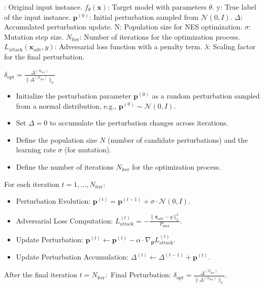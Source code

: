 : Original input instance.  
$f_{\theta}(\mathbf{x})$: Target model with parameters $\theta$.  
y: True label of the input instance.  
$\mathbf{p}^{(0)}$: Initial perturbation sampled from $\mathcal{N}(0, I)$.  
$\Delta$: Accumulated perturbation update.  
N: Population size for NES optimization.  
$\sigma$: Mutation step size.  
$N_{\text{iter}}$: Number of iterations for the optimization process.  
$L_{\text{attack}}(\mathbf{x}_{\text{adv}}, y)$: Adversarial loss function with a penalty term.  
$\lambda$: Scaling factor for the final perturbation.

$\delta_{\text{opt}} = \frac{\Delta^{(N_{\text{iter}})}}{\|\Delta^{(N_{\text{iter}})}\|_2}$

\begin{itemize}
    \item Initialize the perturbation parameter $\mathbf{p}^{(0)}$ as a random perturbation sampled from a normal distribution, e.g., $\mathbf{p}^{(0)} \sim \mathcal{N}(0, I)$.
    \item Set $\Delta = 0$ to accumulate the perturbation changes across iterations.
    \item Define the population size $N$ (number of candidate perturbations) and the learning rate $\sigma$ (for mutation).
    \item Define the number of iterations $N_{\text{iter}}$ for the optimization process.
\end{itemize}

For each iteration $t = 1, \ldots, N_{\text{iter}}:$
\begin{itemize}
    \item Perturbation Evolution: $\mathbf{p}^{(t)} = \mathbf{p}^{(t-1)} + \sigma \cdot \mathcal{N}(0, I)$.
    
    \item Adversarial Loss Computation: $L_{\text{attack}}^{(t)} = -\frac{\|\mathbf{x}_{\text{adv}} - y\|_2^2}{P_{\text{max}}}$.

    \item Update Perturbation: $\mathbf{p}^{(t)} \leftarrow \mathbf{p}^{(t)} - \alpha \cdot \nabla_{\mathbf{p}} L_{\text{attack}}^{(t)}$.
    
    \item Update Perturbation Accumulation: $\Delta^{(t)} \leftarrow \Delta^{(t-1)} + \mathbf{p}^{(t)}$.
\end{itemize}

After the final iteration $t = N_{\text{iter}}:$
Final Perturbation: $\delta_{\text{opt}} = \frac{\Delta^{(N_{\text{iter}})}}{\|\Delta^{(N_{\text{iter}})}\|_2}$.
    
